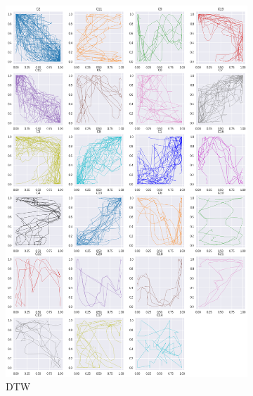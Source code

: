 \begin{figure}[h]
  \hspace{.5em}
  \begin{subfigure}[c]{0.3\linewidth}
    \includegraphics[width=\linewidth]{figs/clusters/CLU_H_ALL[DTW].png}
    \caption{DTW}
  \end{subfigure}
  \hspace{.5em}
   \begin{subfigure}[c]{0.3\linewidth}

\end{subfigure}
\end{figure}
